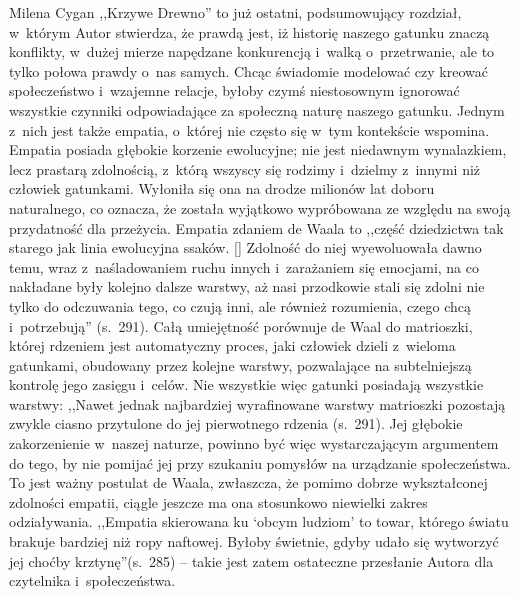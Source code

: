 \begin{recplenv}{Milena Cygan}
,,Krzywe Drewno'' to już ostatni, podsumowujący rozdział, w~którym Autor stwierdza, że prawdą jest, iż historię naszego
gatunku znaczą konflikty, w~dużej mierze napędzane konkurencją i~walką o~przetrwanie, ale to tylko połowa prawdy o~nas
samych. Chcąc świadomie modelować czy kreować społeczeństwo i~wzajemne relacje, byłoby czymś niestosownym ignorować
wszystkie czynniki odpowiadające za społeczną naturę naszego gatunku. Jednym z~nich jest także empatia, o~której nie
często się w~tym kontekście wspomina. Empatia posiada głębokie korzenie ewolucyjne; nie jest niedawnym wynalazkiem,
lecz prastarą zdolnością, z~którą wszyscy się rodzimy i~dzielmy z~innymi niż człowiek gatunkami. Wyłoniła się ona na
drodze milionów lat doboru naturalnego, co oznacza, że została wyjątkowo wypróbowana ze względu na swoją przydatność
dla przeżycia. Empatia zdaniem de Waala to ,,część dziedzictwa tak starego jak linia ewolucyjna ssaków. [\mydots] Zdolność do
niej wyewoluowała dawno temu, wraz z~naśladowaniem ruchu innych i~zarażaniem się emocjami, na co nakładane były kolejno
dalsze warstwy, aż nasi przodkowie stali się zdolni nie tylko do odczuwania tego, co czują inni, ale również
rozumienia, czego chcą i~potrzebują'' (s.~291). Całą umiejętność porównuje de Waal do matrioszki, której rdzeniem jest
automatyczny proces, jaki człowiek dzieli z~wieloma gatunkami, obudowany przez kolejne warstwy, pozwalające na
subtelniejszą kontrolę jego zasięgu i~celów. Nie wszystkie więc gatunki posiadają wszystkie warstwy: ,,Nawet jednak
najbardziej wyrafinowane warstwy matrioszki pozostają zwykle ciasno przytulone do jej pierwotnego rdzenia (s.~291). Jej
głębokie zakorzenienie w~naszej naturze, powinno być więc wystarczającym argumentem do tego, by nie pomijać jej przy
szukaniu pomysłów na urządzanie społeczeństwa. To jest ważny postulat de Waala, zwłaszcza, że pomimo dobrze
wykształconej zdolności empatii, ciągle jeszcze ma ona stosunkowo niewielki zakres odziaływania. ,,Empatia skierowana ku
`obcym ludziom' to towar, którego światu brakuje bardziej niż ropy naftowej. Byłoby świetnie, gdyby udało się wytworzyć
jej choćby krztynę''(s.~285) -- takie jest zatem ostateczne przesłanie Autora dla czytelnika i~społeczeństwa.

\enlargethispage{-.5\baselineskip}


\end{recplenv}
